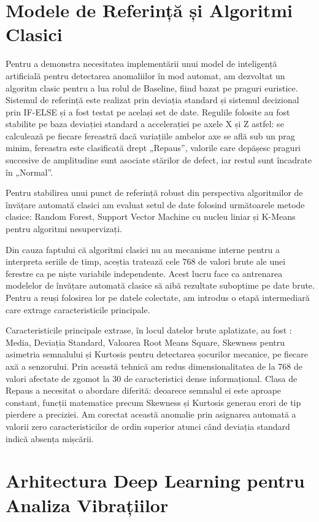 \section{Modele de Referință și Algoritmi Clasici}
	Pentru a demonstra necesitatea implementării unui model de inteligență artificială pentru detectarea anomaliilor în mod automat, am dezvoltat un algoritm clasic pentru a lua rolul de Baseline, fiind bazat pe praguri euristice. Sistemul de referință este realizat prin deviația standard și sistemul decizional prin IF-ELSE și a fost testat pe același set de date. Regulile folosite au fost stabilite pe baza deviației standard a accelerației pe axele X și Z astfel: se calculează pe fiecare fereastră dacă variațiile ambelor axe se află sub un prag minim, fereastra este clasificată drept „Repaus”, valorile care depășesc praguri succesive de amplitudine sunt asociate stărilor de defect, iar restul sunt încadrate în „Normal”.
	
	Pentru stabilirea unui punct de referință robust din perspectiva algoritmilor de învățare automată clasici am evaluat setul de date folosind următoarele metode clasice: Random Forest, Support Vector Machine cu nucleu liniar și K-Means pentru algoritmi nesupervizați.
	
	Din cauza faptului că algoritmi clasici nu au mecanisme interne pentru a interpreta seriile de timp, aceștia tratează cele 768 de valori brute ale unei ferestre ca pe niște variabile independente. Acest lucru face ca antrenarea modelelor de învățare automată clasice să aibă rezultate suboptime pe date brute. Pentru a reuși folosirea lor pe datele colectate, am introdus o etapă intermediară care extrage caracteristicile principale.
	
	Caracteristicile principale extrase, în locul datelor brute aplatizate, au fost : Media, Deviația Standard, Valoarea Root Means Square, Skewness pentru asimetria semnalului și Kurtosis pentru detectarea șocurilor mecanice, pe fiecare axă a senzorului. Prin această tehnică am redus dimensionalitatea de la 768 de valori afectate de zgomot la 30 de caracteristici dense informațional. Clasa de Repaus a necesitat o abordare diferită: deoarece semnalul ei este aproape constant, funcții matematice precum Skewness și Kurtosis generau erori de tip pierdere a preciziei. Am corectat această anomalie prin asignarea automată a valorii zero caracteristicilor de ordin superior atunci când deviația standard indică absența mișcării.
	
\section{Arhitectura Deep Learning pentru Analiza Vibrațiilor}
	
